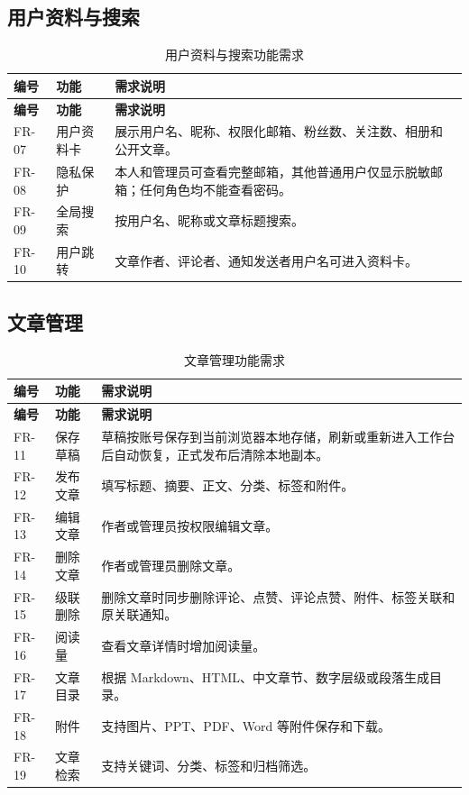 \documentclass[UTF8,a4paper,12pt]{ctexart}
\begin{document}
\subsection{用户资料与搜索}

\begin{longtable}{>{\centering\arraybackslash}p{2.1cm}p{3.3cm}p{8.6cm}}
\caption{用户资料与搜索功能需求}\\
\toprule
\rowcolor{tablehead}\textbf{编号} & \textbf{功能} & \textbf{需求说明}\\
\midrule
\endfirsthead
\toprule
\rowcolor{tablehead}\textbf{编号} & \textbf{功能} & \textbf{需求说明}\\
\midrule
\endhead
FR-07 & 用户资料卡 & 展示用户名、昵称、权限化邮箱、粉丝数、关注数、相册和公开文章。\\
FR-08 & 隐私保护 & 本人和管理员可查看完整邮箱，其他普通用户仅显示脱敏邮箱；任何角色均不能查看密码。\\
FR-09 & 全局搜索 & 按用户名、昵称或文章标题搜索。\\
FR-10 & 用户跳转 & 文章作者、评论者、通知发送者用户名可进入资料卡。\\
\bottomrule
\end{longtable}

\subsection{文章管理}

\begin{longtable}{>{\centering\arraybackslash}p{2.1cm}p{3.3cm}p{8.6cm}}
\caption{文章管理功能需求}\\
\toprule
\rowcolor{tablehead}\textbf{编号} & \textbf{功能} & \textbf{需求说明}\\
\midrule
\endfirsthead
\toprule
\rowcolor{tablehead}\textbf{编号} & \textbf{功能} & \textbf{需求说明}\\
\midrule
\endhead
FR-11 & 保存草稿 & 草稿按账号保存到当前浏览器本地存储，刷新或重新进入工作台后自动恢复，正式发布后清除本地副本。\\
FR-12 & 发布文章 & 填写标题、摘要、正文、分类、标签和附件。\\
FR-13 & 编辑文章 & 作者或管理员按权限编辑文章。\\
FR-14 & 删除文章 & 作者或管理员删除文章。\\
FR-15 & 级联删除 & 删除文章时同步删除评论、点赞、评论点赞、附件、标签关联和原关联通知。\\
FR-16 & 阅读量 & 查看文章详情时增加阅读量。\\
FR-17 & 文章目录 & 根据 Markdown、HTML、中文章节、数字层级或段落生成目录。\\
FR-18 & 附件 & 支持图片、PPT、PDF、Word 等附件保存和下载。\\
FR-19 & 文章检索 & 支持关键词、分类、标签和归档筛选。\\
\bottomrule
\end{longtable}
\end{document}
